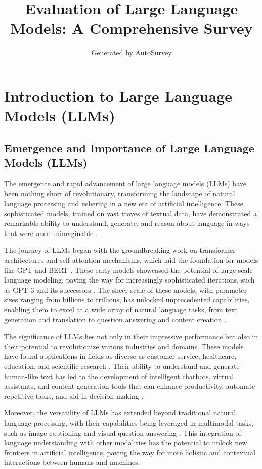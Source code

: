 \documentclass[11pt]{article}
\title{Evaluation of Large Language Models: A Comprehensive Survey}
\author{Generated by AutoSurvey}
\date{}
\begin{document}
\maketitle
\tableofcontents
\newpage

\section{Introduction to Large Language Models (LLMs)}

\subsection{Emergence and Importance of Large Language Models (LLMs)}

The emergence and rapid advancement of large language models (LLMs) have been nothing short of revolutionary, transforming the landscape of natural language processing and ushering in a new era of artificial intelligence. These sophisticated models, trained on vast troves of textual data, have demonstrated a remarkable ability to understand, generate, and reason about language in ways that were once unimaginable \cite{ref1,ref2}.

The journey of LLMs began with the groundbreaking work on transformer architectures and self-attention mechanisms, which laid the foundation for models like GPT and BERT \cite{ref3}. These early models showcased the potential of large-scale language modeling, paving the way for increasingly sophisticated iterations, such as GPT-3 and its successors \cite{ref2}. The sheer scale of these models, with parameter sizes ranging from billions to trillions, has unlocked unprecedented capabilities, enabling them to excel at a wide array of natural language tasks, from text generation and translation to question answering and content creation \cite{ref1}.

The significance of LLMs lies not only in their impressive performance but also in their potential to revolutionize various industries and domains. These models have found applications in fields as diverse as customer service, healthcare, education, and scientific research \cite{ref4,ref5,ref6}. Their ability to understand and generate human-like text has led to the development of intelligent chatbots, virtual assistants, and content-generation tools that can enhance productivity, automate repetitive tasks, and aid in decision-making \cite{ref7,ref8}.

Moreover, the versatility of LLMs has extended beyond traditional natural language processing, with their capabilities being leveraged in multimodal tasks, such as image captioning and visual question answering \cite{ref9}. This integration of language understanding with other modalities has the potential to unlock new frontiers in artificial intelligence, paving the way for more holistic and contextual interactions between humans and machines.
\end{document}
